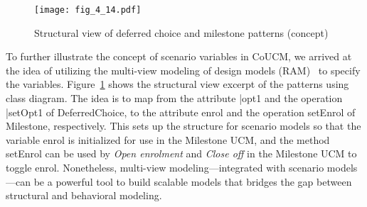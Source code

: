 \begin{figure}
	\centering
	\texttt{[image: fig\_4\_14.pdf]}
	\caption{Structural view of deferred choice and milestone patterns (concept)}
	\label{fig:4.14}
\end{figure}

To further illustrate the concept of scenario variables in CoUCM, we arrived at the idea of utilizing the multi-view modeling of design models (RAM)~\cite{kienzle2009aspect} to specify the variables. Figure~\ref{fig:4.14} shows the structural view excerpt of the patterns using class diagram. The idea is to map from the attribute {\cls |opt1} and the operation {\cls |setOpt1} of DeferredChoice, to the attribute {\cls enrol} and the operation {\cls setEnrol} of Milestone, respectively. This sets up the structure for scenario models so that the variable {\cls enrol} is initialized for use in the Milestone UCM, and the method {\cls setEnrol} can be used by \emph{Open enrolment} and \emph{Close off} in the Milestone UCM to toggle {\cls enrol}. Nonetheless, multi-view modeling---integrated with scenario models---can be a powerful tool to build scalable models that bridges the gap between structural and behavioral modeling.
